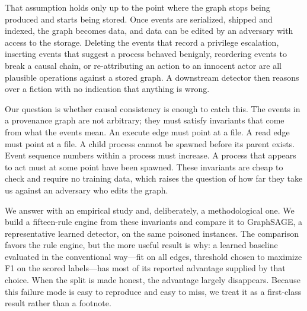 \documentclass[journal]{IEEEtran}
\begin{document}
That assumption holds only up to the point where the graph stops being produced
and starts being stored. Once events are serialized, shipped and indexed, the
graph becomes data, and data can be edited by an adversary with access to the
storage. Deleting the events that record a privilege escalation, inserting
events that suggest a process behaved benignly, reordering events to break a
causal chain, or re-attributing an action to an innocent actor are all plausible
operations against a stored graph. A downstream detector then reasons over a
fiction with no indication that anything is wrong.

Our question is whether causal consistency is enough to catch this. The events
in a provenance graph are not arbitrary; they must satisfy invariants that come
from what the events mean. An execute edge must point at a file. A read edge
must point at a file. A child process cannot be spawned before its parent
exists. Event sequence numbers within a process must increase. A process that
appears to act must at some point have been spawned. These invariants are cheap
to check and require no training data, which raises the question of how far they
take us against an adversary who edits the graph.

We answer with an empirical study and, deliberately, a methodological one. We
build a fifteen-rule engine from these invariants and compare it to GraphSAGE, a
representative learned detector, on the same poisoned instances. The comparison
favors the rule engine, but the more useful result is why: a learned baseline
evaluated in the conventional way---fit on all edges, threshold chosen to
maximize F1 on the scored labels---has most of its reported advantage supplied
by that choice. When the split is made honest, the advantage largely disappears.
Because this failure mode is easy to reproduce and easy to miss, we treat it as
a first-class result rather than a footnote.
\end{document}
